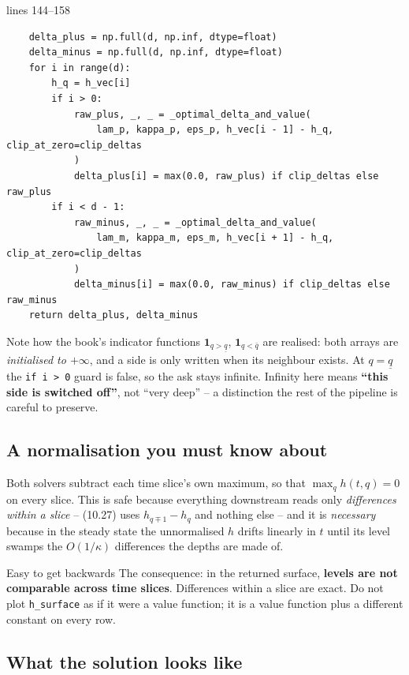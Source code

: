 \documentclass[11pt,a4paper]{article}
\newcommand{\code}[1]{\texttt{\small #1}}
\newcommand{\snip}[3]{%
  \par\addvspace{6pt}\noindent
  {\footnotesize\color{NavyLink}\texttt{\detokenize{#1}}\quad lines #2--#3}%
  \par\nobreak\vspace{1pt}}
\begin{document}
\snip{scripts/hjb.py}{144}{158}
\begin{lstlisting}
    delta_plus = np.full(d, np.inf, dtype=float)
    delta_minus = np.full(d, np.inf, dtype=float)
    for i in range(d):
        h_q = h_vec[i]
        if i > 0:
            raw_plus, _, _ = _optimal_delta_and_value(
                lam_p, kappa_p, eps_p, h_vec[i - 1] - h_q, clip_at_zero=clip_deltas
            )
            delta_plus[i] = max(0.0, raw_plus) if clip_deltas else raw_plus
        if i < d - 1:
            raw_minus, _, _ = _optimal_delta_and_value(
                lam_m, kappa_m, eps_m, h_vec[i + 1] - h_q, clip_at_zero=clip_deltas
            )
            delta_minus[i] = max(0.0, raw_minus) if clip_deltas else raw_minus
    return delta_plus, delta_minus
\end{lstlisting}

Note how the book's indicator functions $\mathbf{1}_{q>\underline{q}}$,
$\mathbf{1}_{q<\bar{q}}$ are realised: both arrays are \emph{initialised to
$+\infty$}, and a side is only written when its neighbour exists. At
$q = \underline{q}$ the \code{if i > 0} guard is false, so the ask stays infinite.
Infinity here means \textbf{``this side is switched off''}, not ``very deep'' --
a distinction the rest of the pipeline is careful to preserve.

\subsection{A normalisation you must know about}

Both solvers subtract each time slice's own maximum, so that
$\max_q h(t,q) = 0$ on every slice. This is safe because everything downstream
reads only \emph{differences within a slice} -- (10.27) uses
$h_{q\mp1} - h_q$ and nothing else -- and it is \emph{necessary} because in the
steady state the unnormalised $h$ drifts linearly in $t$ until its level swamps
the $O(1/\kappa)$ differences the depths are made of.

\begin{trap}{Easy to get backwards}
The consequence: in the returned surface, \textbf{levels are not comparable
across time slices}. Differences within a slice are exact. Do not plot
\code{h\_surface} as if it were a value function; it is a value function plus a
different constant on every row.
\end{trap}

\subsection{What the solution looks like}
\end{document}
